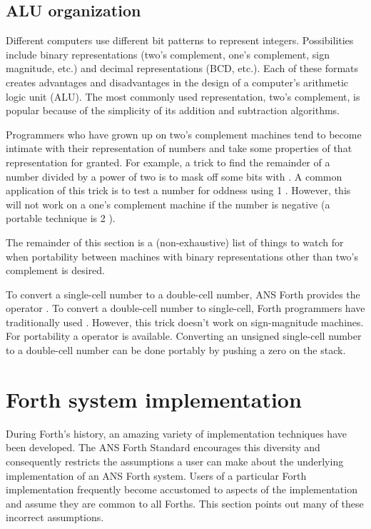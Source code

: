 \subsection{ALU organization} %

Different computers use different bit patterns to represent integers.
Possibilities include binary representations (two's complement, one's
complement, sign magnitude, etc.) and decimal representations (BCD,
etc.). Each of these formats creates advantages and disadvantages in
the design of a computer's arithmetic logic unit (ALU). The most
commonly used representation, two's complement, is popular because of
the simplicity of its addition and subtraction algorithms.

Programmers who have grown up on two's complement machines tend to
become intimate with their representation of numbers and take some
properties of that representation for granted. For example, a trick
to find the remainder of a number divided by a power of two is to mask
off some bits with . A common application of this trick is
to test a number for oddness using 1 . However, this will
not work on a one's complement machine if the number is negative (a
portable technique is 2 ).

The remainder of this section is a (non-exhaustive) list of things to
watch for when portability between machines with binary representations
other than two's complement is desired.

To convert a single-cell number to a double-cell number, ANS Forth
provides the operator . To convert a double-cell number to
single-cell, Forth programmers have traditionally used .
However, this trick doesn't work on sign-magnitude machines. For
portability a  operator is available. Converting an
unsigned single-cell number to a double-cell number can be done portably
by pushing a zero on the stack.


\section{Forth system implementation} %

During Forth's history, an amazing variety of implementation techniques
have been developed. The ANS Forth Standard encourages this diversity
and consequently restricts the assumptions a user can make about the
underlying implementation of an ANS Forth system. Users of a particular
Forth implementation frequently become accustomed to aspects of the
implementation and assume they are common to all Forths. This section
points out many of these incorrect assumptions.

